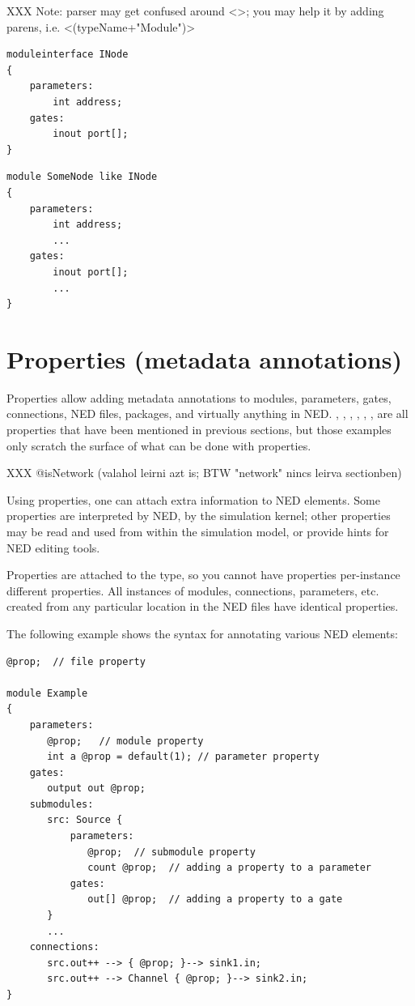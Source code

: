 XXX Note: parser may get confused around <>; you may help it by adding parens, i.e. <(typeName+"Module")>

\begin{Verbatim}
moduleinterface INode
{
    parameters:
        int address;
    gates:
        inout port[];
}
\end{Verbatim}

\begin{Verbatim}
module SomeNode like INode
{
    parameters:
        int address;
        ...
    gates:
        inout port[];
        ...
}
\end{Verbatim}


\section{Properties (metadata annotations)}
\label{sec:ch-ned-lang:properties}

Properties allow adding metadata annotations to modules, parameters, gates,
connections, NED files, packages, and virtually anything in NED.
, , , , ,
,  are all properties that have been mentioned in
previous sections, but those examples only scratch the surface of what can
be done with properties.

XXX @isNetwork (valahol leirni azt is; BTW "network" nincs leirva sectionben)

Using properties, one can attach extra information to NED elements. Some
properties are interpreted by NED, by the simulation kernel; other
properties may be read and used from within the simulation model, or
provide hints for NED editing tools.

Properties are attached to the type, so you cannot have properties
per-instance different properties. All instances of modules, connections,
parameters, etc. created from any particular location in the NED files have
identical properties.

The following example shows the syntax for annotating various NED elements:

\begin{Verbatim}
@prop;  // file property

module Example
{
    parameters:
       @prop;   // module property
       int a @prop = default(1); // parameter property
    gates:
       output out @prop;
    submodules:
       src: Source {
           parameters:
              @prop;  // submodule property
              count @prop;  // adding a property to a parameter
           gates:
              out[] @prop;  // adding a property to a gate
       }
       ...
    connections:
       src.out++ --> { @prop; }--> sink1.in;
       src.out++ --> Channel { @prop; }--> sink2.in;
}
\end{Verbatim}



